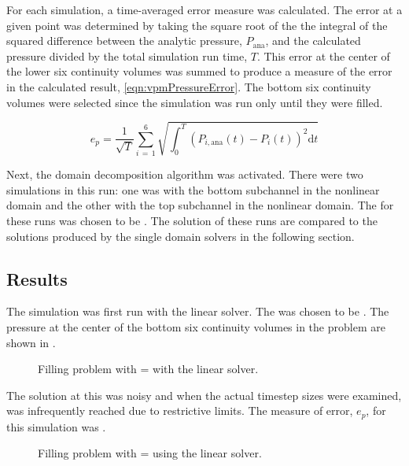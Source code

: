 For each simulation, a time-averaged error measure was calculated.
The error at a given point was determined by taking the square root of the the integral of the squared difference between the analytic pressure, $P_{\text{ana}}$, and the calculated pressure divided by the total simulation run time, $T$.
This error at the center of the lower six continuity volumes was summed to produce a measure of the error in the calculated result, \eqref{eqn:vpmPressureError}.
The bottom six continuity volumes were selected since the simulation was run only until they were filled.

\begin{equation}
\label{eqn:vpmPressureError}
e_{p} =  \frac{1}{\sqrt{T}} \sum_{i\,=\,1}^{6}\sqrt{\int_{0}^{T} \left(P_{i,\text{ana}}(t) - P_{i}(t)\right)^{2} \mathrm{d} t}
\end{equation}

Next, the domain decomposition algorithm was activated.
There were two simulations in this run: one was with the bottom subchannel in the nonlinear domain and the other with the top subchannel in the nonlinear domain.
The \dtmax{} for these runs was chosen to be .
The solution of these runs are compared to the solutions produced by the single domain solvers in the following section.

\subsection{Results}
\label{subsect:vmpResults}

The simulation was first run with the linear solver.
The \dtmax{} was chosen to be .
The pressure at the center of the bottom six continuity volumes in the problem are shown in .

\begin{figure}[h!tb]
\centering

\caption{Filling problem with \dtmax{} =  with the linear solver.}
\label{fig:linFill1em1}
\end{figure}

The solution at this \dtmax{} was noisy and when the actual timestep sizes were examined, \dtmax{} was infrequently reached due to restrictive \dtcrnt{} limits.
The measure of error, $e_{p}$, for this simulation was .

\begin{figure}[h!tb]
\centering

\caption{Filling problem with \dtmax{} =  using the linear solver.}
\label{fig:vmpLinFill5em2}
\end{figure}

